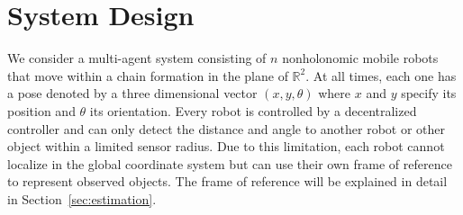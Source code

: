 \documentclass[letterpaper, 10 pt, conference]{ieeeconf}  %
\begin{document}
	
	\section{System Design}
	\label{sec:sysdesign}
	
	We consider a multi-agent system consisting of $n$ nonholonomic mobile
	robots that move within a chain formation in the plane of
	$\mathbb{R}^2$. At all times, each one has a pose denoted by a three
	dimensional vector $(x, y, \theta)$ where $x$ and $y$ specify its
	position and $\theta$ its orientation. Every robot is controlled by a
	decentralized controller and can only detect the distance and angle to
	another robot or other object within a limited sensor radius. Due to
	this limitation, each robot cannot localize in the global coordinate
	system but can use their own frame of reference to represent observed
	objects. The frame of reference will be explained in detail in
	Section~\ref{sec:estimation}.
	
\end{document}
